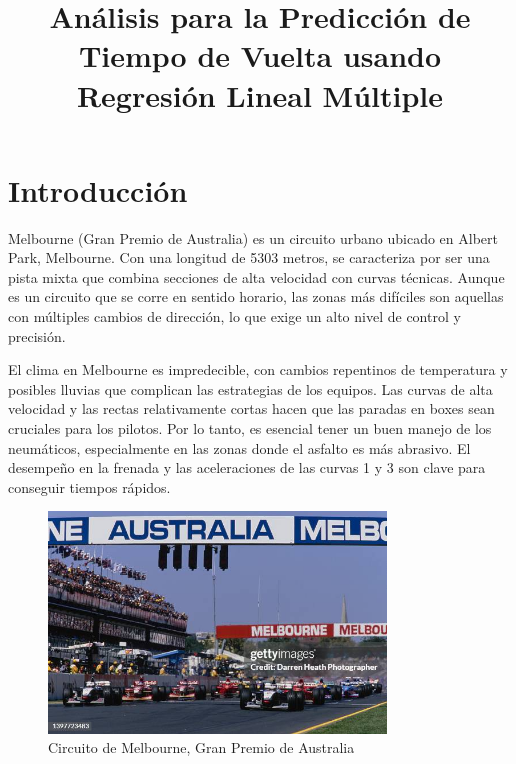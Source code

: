 \documentclass{article}
\begin{document}
\newpage

	
	\title{Análisis para la Predicción de Tiempo de Vuelta usando Regresión Lineal Múltiple}
	\author{}
	\date{}
	\maketitle
	
	\section{Introducción}
	
	Melbourne (Gran Premio de Australia) es un circuito urbano ubicado en Albert Park, Melbourne. Con una longitud de 5303 metros, se caracteriza por ser una pista mixta que combina secciones de alta velocidad con curvas técnicas. Aunque es un circuito que se corre en sentido horario, las zonas más difíciles son aquellas con múltiples cambios de dirección, lo que exige un alto nivel de control y precisión.
	
	El clima en Melbourne es impredecible, con cambios repentinos de temperatura y posibles lluvias que complican las estrategias de los equipos. Las curvas de alta velocidad y las rectas relativamente cortas hacen que las paradas en boxes sean cruciales para los pilotos. Por lo tanto, es esencial tener un buen manejo de los neumáticos, especialmente en las zonas donde el asfalto es más abrasivo. El desempeño en la frenada y las aceleraciones de las curvas 1 y 3 son clave para conseguir tiempos rápidos.
	
	\begin{figure}[h]
		\centering
		\includegraphics[width=0.8\textwidth]{../img/melbourne.jpg}
		\caption{Circuito de Melbourne, Gran Premio de Australia}
		\label{fig:melbourne}
	\end{figure}
	
\end{document}
